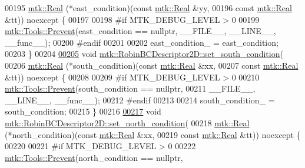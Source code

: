 \begin{DoxyCode}
00195     \hyperlink{group__c01-roots_gac080bbbf5cbb5502c9f00405f894857d}{mtk::Real} (*east\_condition)(\textcolor{keyword}{const} \hyperlink{group__c01-roots_gac080bbbf5cbb5502c9f00405f894857d}{mtk::Real} &yy,
00196                                 \textcolor{keyword}{const} \hyperlink{group__c01-roots_gac080bbbf5cbb5502c9f00405f894857d}{mtk::Real} &tt)) noexcept \{
00197 
00198 \textcolor{preprocessor}{  #if MTK\_DEBUG\_LEVEL > 0}
00199   \hyperlink{classmtk_1_1Tools_a332324c6f25e66be9dff48c5987a3b9f}{mtk::Tools::Prevent}(east\_condition == \textcolor{keyword}{nullptr}, \_\_FILE\_\_, \_\_LINE\_\_, \_\_func\_\_);
00200 \textcolor{preprocessor}{  #endif}
00201 
00202   east\_condition\_ = east\_condition;
00203 \}
00204 
\hypertarget{mtk__robin__bc__descriptor__2d_8cc_source_l00205}{}\hyperlink{classmtk_1_1RobinBCDescriptor2D_a3fbdf58ba24861011fd852f0c642a4c8}{00205} \textcolor{keywordtype}{void} \hyperlink{classmtk_1_1RobinBCDescriptor2D_a3fbdf58ba24861011fd852f0c642a4c8}{mtk::RobinBCDescriptor2D::set\_south\_condition}(
00206     \hyperlink{group__c01-roots_gac080bbbf5cbb5502c9f00405f894857d}{mtk::Real} (*south\_condition)(\textcolor{keyword}{const} \hyperlink{group__c01-roots_gac080bbbf5cbb5502c9f00405f894857d}{mtk::Real} &xx,
00207                                  \textcolor{keyword}{const} \hyperlink{group__c01-roots_gac080bbbf5cbb5502c9f00405f894857d}{mtk::Real} &tt)) noexcept \{
00208 
00209 \textcolor{preprocessor}{  #if MTK\_DEBUG\_LEVEL > 0}
00210   \hyperlink{classmtk_1_1Tools_a332324c6f25e66be9dff48c5987a3b9f}{mtk::Tools::Prevent}(south\_condition == \textcolor{keyword}{nullptr},
00211                       \_\_FILE\_\_, \_\_LINE\_\_, \_\_func\_\_);
00212 \textcolor{preprocessor}{  #endif}
00213 
00214   south\_condition\_ = south\_condition;
00215 \}
00216 
\hypertarget{mtk__robin__bc__descriptor__2d_8cc_source_l00217}{}\hyperlink{classmtk_1_1RobinBCDescriptor2D_ade17884e6a2636a7c6f989602a0052e0}{00217} \textcolor{keywordtype}{void} \hyperlink{classmtk_1_1RobinBCDescriptor2D_ade17884e6a2636a7c6f989602a0052e0}{mtk::RobinBCDescriptor2D::set\_north\_condition}(
00218     \hyperlink{group__c01-roots_gac080bbbf5cbb5502c9f00405f894857d}{mtk::Real} (*north\_condition)(\textcolor{keyword}{const} \hyperlink{group__c01-roots_gac080bbbf5cbb5502c9f00405f894857d}{mtk::Real} &xx,
00219                                  \textcolor{keyword}{const} \hyperlink{group__c01-roots_gac080bbbf5cbb5502c9f00405f894857d}{mtk::Real} &tt)) noexcept \{
00220 
00221 \textcolor{preprocessor}{  #if MTK\_DEBUG\_LEVEL > 0}
00222   \hyperlink{classmtk_1_1Tools_a332324c6f25e66be9dff48c5987a3b9f}{mtk::Tools::Prevent}(north\_condition == \textcolor{keyword}{nullptr},

\end{DoxyCode}
